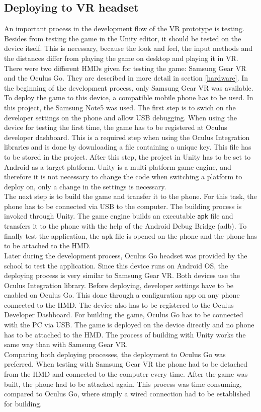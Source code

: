 \subsection{Deploying to VR headset}
An important process in the development flow of the VR prototype is testing. Besides from testing the game in the Unity editor, it should be tested on the device itself. This is necessary, because the look and feel, the input methods and the distances differ from playing the game on desktop and playing it in VR. \\
There were two different HMDs given for testing the game: Samsung Gear VR and the Oculus Go. They are described in more detail in section \ref{hardware}. In the beginning of the development process, only Samsung Gear VR was available. To deploy the game to this device, a compatible mobile phone has to be used. In this project, the Samsung Note5 was used. The first step is to swich on the developer settings on the phone and allow USB debugging. When using the device for testing the first time, the game has to be registered at Oculus developer dashboard. This is a required step when using the Oculus Integration libraries and is done by downloading a file containing a unique key. This file has to be stored in the project. \cite{?}
After this step, the project in Unity has to be set to Android as a target platform. Unity is a multi platform game engine, and therefore it is not necessary to change the code when switching a platform to deploy on, only a change in the settings is necessary.\\
The next step is to build the game and transfer it to the phone. For this task, the phone has to be connected via USB to the computer. The building process is invoked through Unity. The game engine builds an executable \texttt{apk} file and transfers it to the phone with the help of the Android Debug Bridge (adb). To finally test the application, the apk file is opened on the phone and the phone has to be attached to the HMD.\\
Later during the development process, Oculus Go headset was provided by the school to test the application. Since this device runs on Android OS, the deploying process is very similar to Samsung Gear VR. Both devices use the Oculus Integration library. Before deploying, developer settings have to be enabled on Oculus Go. This done through a configuration app on any phone connected to the HMD. The device also has to be registered to the Oculus Developer Dashboard. For building the game, Oculus Go has to be connected with the PC via USB. The game is deployed on the device directly and no phone has to be attached to the HMD. The process of building with Unity works the same way than with Samsung Gear VR.\\
Comparing both deploying processes, the deployment to Oculus Go was preferred. When testing with Samsung Gear VR the phone had to be detached from the HMD and connected to the computer every time. After the game was built, the phone had to be attached again. This process was time consuming, compared to Oculus Go, where simply a wired connection had to be established for building. 
